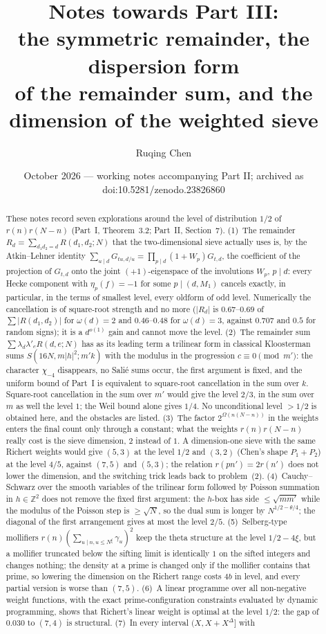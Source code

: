 \documentclass[11pt,a4paper]{article}
\title{Notes towards Part III:\\ the symmetric remainder, the dispersion form\\ of the remainder sum, and the dimension of the weighted sieve}
\author{Ruqing Chen}
\date{October 2026 --- working notes accompanying Part II; archived as doi:10.5281/zenodo.23826860}
\theoremstyle{remark}
\theoremstyle{definition}
\newcommand{\Z}{\mathbb Z}
\begin{document}
\maketitle

\begin{abstract}
These notes record seven explorations around the level of distribution $1/2$ of $r(n)r(N-n)$ (Part~I, Theorem~3.2; Part~II, Section~7). (1)~The remainder $R_d=\sum_{d_1d_2=d}R(d_1,d_2;N)$ that the two-dimensional sieve actually uses is, by the Atkin--Lehner identity $\sum_{u\mid d}G_{tu,d/u}=\prod_{p\mid d}(1+W_p)G_{t,d}$, the coefficient of the projection of $G_{t,d}$ onto the joint $(+1)$-eigenspace of the involutions $W_p$, $p\mid d$: every Hecke component with $\eta_p(f)=-1$ for some $p\mid(d,M_1)$ cancels exactly, in particular, in the terms of smallest level, every oldform of odd level. Numerically the cancellation is of square-root strength and no more ($|R_d|$ is $0.67$--$0.69$ of $\sum|R(d_1,d_2)|$ for $\omega(d)=2$ and $0.46$--$0.48$ for $\omega(d)=3$, against $0.707$ and $0.5$ for random signs); it is a $d^{o(1)}$ gain and cannot move the level. (2)~The remainder sum $\sum\lambda_d\lambda'_e R(d,e;N)$ has as its leading term a trilinear form in classical Kloosterman sums $S(16N,m|h|^2;m'k)$ with the modulus in the progression $c\equiv0\pmod{m'}$: the character $\chi_{-4}$ disappears, no Sali\'e sums occur, the first argument is fixed, and the uniform bound of Part~I is equivalent to square-root cancellation in the sum over $k$. Square-root cancellation in the sum over $m'$ would give the level $2/3$, in the sum over $m$ as well the level $1$; the Weil bound alone gives $1/4$. No unconditional level $>1/2$ is obtained here, and the obstacles are listed. (3)~The factor $2^{\Omega(n(N-n))}$ in the weights enters the final count only through a constant; what the weights $r(n)r(N-n)$ really cost is the sieve dimension, $2$ instead of $1$. A dimension-one sieve with the same Richert weights would give $(5,3)$ at the level $1/2$ and $(3,2)$ (Chen's shape $P_1+P_2$) at the level $4/5$, against $(7,5)$ and $(5,3)$; the relation $r(pn')=2r(n')$ does not lower the dimension, and the switching trick leads back to problem~(2). (4)~Cauchy--Schwarz over the smooth variables of the trilinear form followed by Poisson summation in $h\in\Z^2$ does not remove the fixed first argument: the $h$-box has side $\le\sqrt{mm'}$ while the modulus of the Poisson step is $\ge\sqrt N$, so the dual sum is longer by $N^{1/2-\theta/4}$; the diagonal of the first arrangement gives at most the level $2/5$. (5)~Selberg-type mollifiers $r(n)(\sum_{u\mid n,u\le N^\xi}\gamma_u)^2$ keep the theta structure at the level $1/2-4\xi$, but a mollifier truncated below the sifting limit is identically $1$ on the sifted integers and changes nothing; the density at a prime is changed only if the mollifier contains that prime, so lowering the dimension on the Richert range costs $4b$ in level, and every partial version is worse than $(7,5)$. (6)~A linear programme over all non-negative weight functions, with the exact prime-configuration constraints evaluated by dynamic programming, shows that Richert's linear weight is optimal at the level $1/2$: the gap of $0.030$ to $(7,4)$ is structural. (7)~In every interval $(X,X+X^\Delta]$ with 
\end{abstract}
\end{document}
